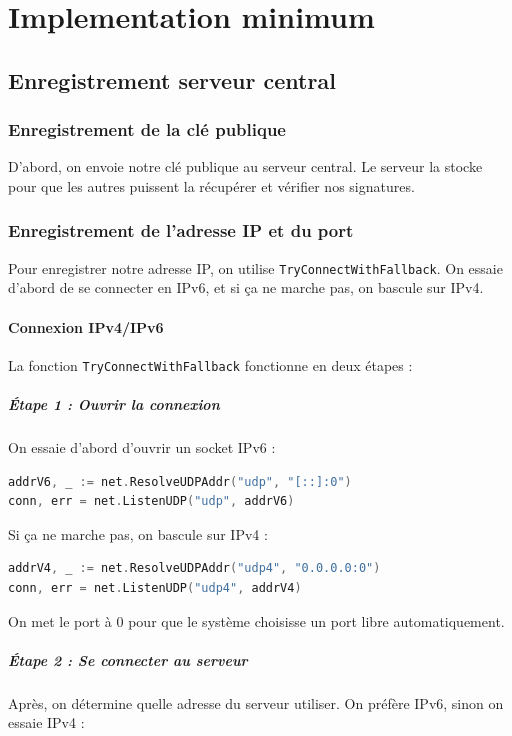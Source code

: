 \documentclass[11pt,a4paper]{report}
\begin{document}
\chapter{Implementation minimum}
\section{Enregistrement serveur central}

\subsection{Enregistrement de la clé publique}
D'abord, on envoie notre clé publique au serveur central. Le serveur la stocke pour que les autres puissent la récupérer et vérifier nos signatures.

\subsection{Enregistrement de l'adresse IP et du port}

Pour enregistrer notre adresse IP, on utilise \texttt{TryConnectWithFallback}. On essaie d'abord de se connecter en IPv6, et si ça ne marche pas, on bascule sur IPv4.

\subsubsection{Connexion IPv4/IPv6}

La fonction \texttt{TryConnectWithFallback} fonctionne en deux étapes :

\paragraph{Étape 1 : Ouvrir la connexion}
On essaie d'abord d'ouvrir un socket IPv6 :
\begin{lstlisting}[language=Go]
addrV6, _ := net.ResolveUDPAddr("udp", "[::]:0")
conn, err = net.ListenUDP("udp", addrV6)
\end{lstlisting}

Si ça ne marche pas, on bascule sur IPv4 :
\begin{lstlisting}[language=Go]
addrV4, _ := net.ResolveUDPAddr("udp4", "0.0.0.0:0")
conn, err = net.ListenUDP("udp4", addrV4)
\end{lstlisting}

On met le port à 0 pour que le système choisisse un port libre automatiquement.

\paragraph{Étape 2 : Se connecter au serveur}
Après, on détermine quelle adresse du serveur utiliser. On préfère IPv6, sinon on essaie IPv4 :
\end{document}
